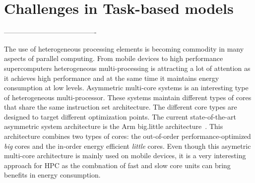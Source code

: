 \section{Challenges in Task-based models}

%


----------------------------------------


The use of heterogeneous processing elements is becoming commodity in many aspects of parallel computing. 
From mobile devices to high performance supercomputers heterogeneous multi-processing is attracting a lot of attention as it achieves high performance and at the same time it maintains energy consumption at low levels. 
Asymmetric multi-core systems is an interesting type of heterogeneous multi-processor. 
These systems maintain different types of cores that share the same instruction set architecture.
The different core types are designed to target different optimization points. 
The current state-of-the-art asymmetric system architecture is the Arm big.little architecture~\cite{ARM,Greenhalgh2011}. 
This architecture combines two types of cores: the out-of-order performance-optimized \textit{big} cores and the in-order energy efficient \textit{little} cores.
Even though this asymetric multi-core architecture is mainly used on mobile devices, it is a very interesting approach for HPC as the combnation of fast and slow core units can bring benefits in energy consumption.




% 
% 
% 

